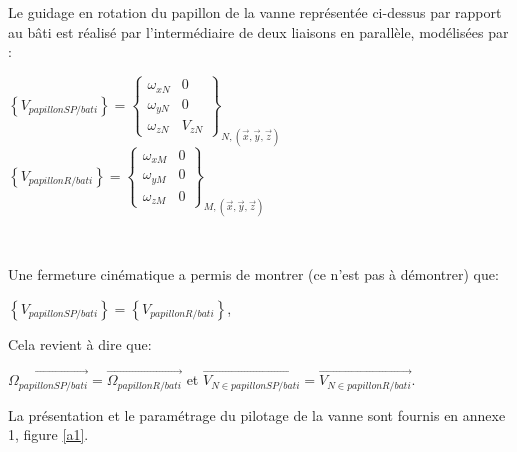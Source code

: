 Le guidage en rotation du papillon de la vanne représentée ci-dessus par rapport au bâti est réalisé par l'intermédiaire de deux liaisons en parallèle, modélisées par :

\begin{center}
$\left\{V_{papillonSP/bati}\right\}=\left\{\begin{array}{cc}
\omega_{xN} & 0\\
\omega_{yN} & 0\\
\omega_{zN} & V_{zN} 
\end{array}
\right\}_{N,(\vec{x},\vec{y},\vec{z})}$
$\left\{V_{papillonR/bati}\right\}=\left\{\begin{array}{cc}
\omega_{xM} & 0\\
\omega_{yM} & 0\\
\omega_{zM} & 0 
\end{array}
\right\}_{M,(\vec{x},\vec{y},\vec{z})}$
\end{center}



~\

Une fermeture cinématique a permis de montrer (ce n'est pas à démontrer) que:
\begin{center}
$\left\{V_{papillonSP/bati}\right\}=\left\{V_{papillonR/bati}\right\}$,
\end{center}

Cela revient à dire que:
\begin{center}
$\overrightarrow{\Omega_{papillonSP/bati}}=\overrightarrow{\Omega_{papillonR/bati}}$ et $\overrightarrow{V_{N\in papillonSP/bati}}=\overrightarrow{V_{N\in papillonR/bati}}$.
\end{center}


\newpage

La présentation et le paramétrage du pilotage de la vanne sont fournis en annexe 1, figure \ref{a1}.


